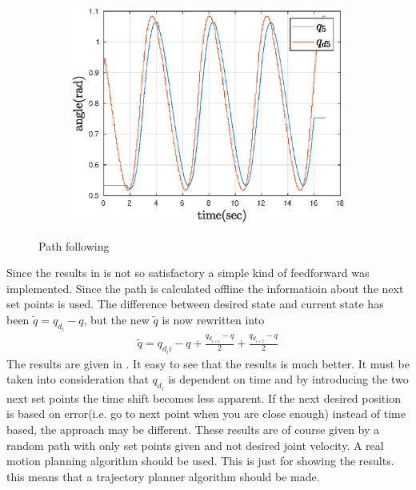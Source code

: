 \begin{figure}[htbp]
\begin{subfigure}[htbp]{0.45\textwidth}
        \centering
        \includegraphics[width = \picsSiz\linewidth]{img/pathF5.eps}
        \caption{ }
    \end{subfigure}
    \caption{Path following}
    \label{fig:pathTS}
\end{figure}
Since the results in  is not so satisfactory a simple kind of feedforward was implemented. Since the path is calculated offline the informatioin about the next set points is used. The difference between desired state and current state has been $\tilde{q} = q_{d_i}-q$, but the new $\tilde{q}$ is now rewritten into 
\begin{align*}
    \tilde{q} = q_{d_ii}-q + \frac{q_{d_{i+1}}-q }{2}+\frac{q_{d_{i+2}}-q }{2}
\end{align*}
The results are given in . It easy to see that the results is much better. It must be taken into consideration that $q_{d_i}$ is dependent on time and by introducing the two next set points the time shift becomes less apparent. If the next desired position is based on error(i.e. go to next point when you are close enough) instead of time based, the approach may be different. These results are of course given by a random path with only set points given and not desired joint velocity. A real motion planning algorithm should be used. This is just for showing the results. this means that a trajectory planner algorithm should be made. 



